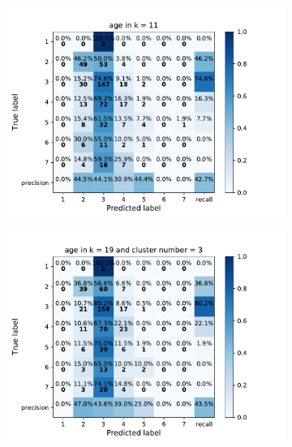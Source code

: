 {\begin{figure}[h]
    \centering
    \begin{subfigure}
      \centering
      \includegraphics[scale=0.45]{fig/super_knn_age.pdf}
    \end{subfigure}%
    \begin{subfigure}
      \centering
      \includegraphics[scale=0.45]{fig/kms_knn_age.pdf}
    \end{subfigure}
\end{figure}

}
